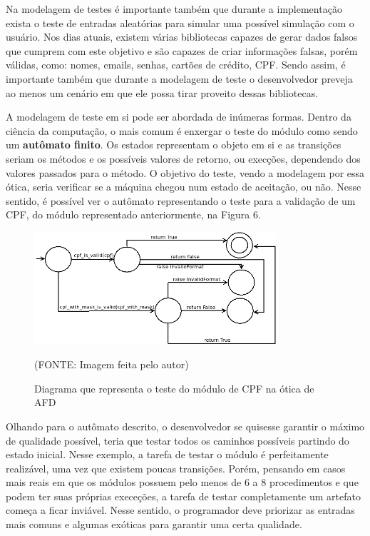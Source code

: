 \documentclass[
    12pt,       %
    openright,      %
    twoside,      %
    a4paper,      %
    english,      %
    french,       %
    spanish,      %
    brazil,       %
    ]{abntex2}
\begin{document}
          Na modelagem de testes é importante também que durante a implementação exista
          o teste de entradas aleatórias para simular uma possível simulação com o usuário.
          Nos dias atuais, existem várias bibliotecas capazes de gerar dados falsos que
          cumprem com este objetivo e são capazes de criar informações falsas, porém válidas,
          como: nomes, emails, senhas, cartões de crédito, CPF. Sendo assim, é importante
          também que durante a modelagem de teste o desenvolvedor preveja ao menos um cenário
          em que ele possa tirar proveito dessas bibliotecas.

          A modelagem de teste em si pode ser abordada de inúmeras formas. Dentro da ciência
          da computação, o mais comum é enxergar o teste do módulo como sendo um \textbf{
          autômato finito}. Os estados representam o objeto em si e as transições
          seriam os métodos e os possíveis valores de retorno, ou execções, dependendo dos
          valores passados para o método. O objetivo do teste, vendo a modelagem por essa
          ótica, seria  verificar se a máquina chegou num estado de aceitação, ou não.
          Nesse sentido, é possível ver o autômato representando o teste para a validação de
          um CPF, do módulo representado anteriormente, na Figura 6.

          \begin{figure}[!htb]
              \begin{center}
                  \includegraphics[width=0.80\textwidth]{img/afd.png}
              \end{center}
              \caption{\label{fig:passaro}Diagrama que representa o teste do módulo de CPF na ótica de AFD}
              \begin{center}(FONTE: Imagem feita pelo autor)\end{center}
          \end{figure}

          Olhando para o autômato descrito, o desenvolvedor se quisesse garantir
          o máximo de qualidade possível, teria que testar todos os caminhos possíveis
          partindo do estado inicial. Nesse exemplo, a tarefa de testar o módulo é perfeitamente
          realizável, uma vez que existem poucas transições. Porém, pensando em casos mais
          reais em que os módulos possuem pelo menos de 6 a 8 procedimentos e que podem ter
          suas próprias execeções, a tarefa de testar completamente um artefato começa a ficar
          inviável. Nesse sentido, o programador deve priorizar as entradas mais comuns
          e algumas exóticas para garantir uma certa qualidade.
\end{document}
